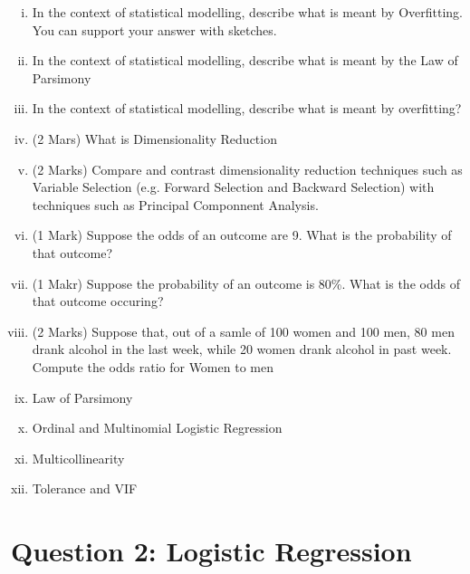\documentclass{article}
\begin{document}
\begin{enumerate}[(i)]
		\item In the context of statistical modelling, describe what is meant by Overfitting. You can support your answer with sketches.
		\item In the context of statistical modelling, describe what is meant by the Law of Parsimony
		\item In the context of statistical modelling, describe what is meant by overfitting?
		\item (2 Mars) What is Dimensionality Reduction
		\item (2 Marks) Compare and contrast dimensionality reduction techniques such as Variable Selection (e.g. Forward Selection and Backward Selection) with techniques such as Principal Componnent Analysis.
	\item(1 Mark) Suppose the odds of an outcome are 9. What is the probability of that outcome?
	\item (1 Makr) Suppose the probability of an outcome is 80\%. What is the odds of that outcome occuring?
	
	\item (2 Marks) Suppose that, out of a samle of 100 women and 100 men, 80 men drank alcohol in the last week, while 20 women drank alcohol in past week. Compute the odds ratio for Women to men
	
	\item Law of Parsimony
	\item 
	Ordinal and Multinomial Logistic Regression
	\item 
	Multicollinearity 
	\item 
	Tolerance and VIF

\end{enumerate}
\newpage
\section*{Question 2: Logistic Regression}
\end{document}
